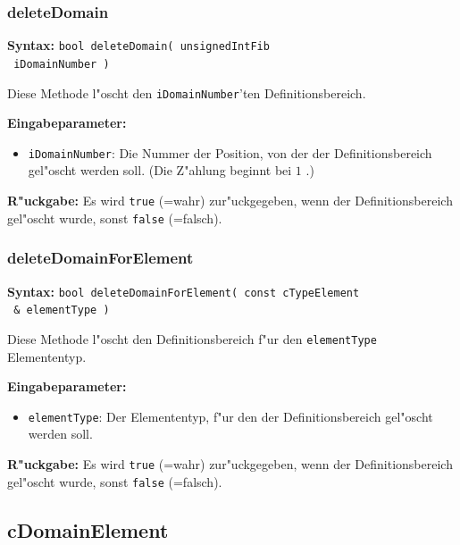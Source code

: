 \subsubsection{deleteDomain}

\textbf{Syntax:} \verb|bool deleteDomain( unsignedIntFib| \\\verb| iDomainNumber )|

\bigskip\noindent
Diese Methode l"oscht den \verb|iDomainNumber|'ten Definitionsbereich.

\bigskip\noindent
\textbf{Eingabeparameter:}
\begin{itemize}
 \item \verb|iDomainNumber|: Die Nummer der Position, von der der Definitionsbereich gel"oscht werden soll. (Die Z"ahlung beginnt bei $1$ .)
\end{itemize}

\bigskip\noindent
\textbf{R"uckgabe:} Es wird \verb|true| (=wahr) zur"uckgegeben, wenn der Definitionsbereich gel"oscht wurde, sonst \verb|false| (=falsch).


\subsubsection{deleteDomainForElement}

\textbf{Syntax:} \verb|bool deleteDomainForElement( const cTypeElement| \\\verb| & elementType )|

\bigskip\noindent
Diese Methode l"oscht den Definitionsbereich f"ur den \verb|elementType| Elemententyp.

\bigskip\noindent
\textbf{Eingabeparameter:}
\begin{itemize}
 \item \verb|elementType|: Der Elemententyp, f"ur den der Definitionsbereich gel"oscht werden soll.
\end{itemize}

\bigskip\noindent
\textbf{R"uckgabe:} Es wird \verb|true| (=wahr) zur"uckgegeben, wenn der Definitionsbereich gel"oscht wurde, sonst \verb|false| (=falsch).



\subsection{cDomainElement}

